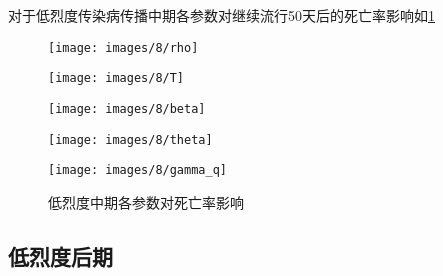 \documentclass[withoutpreface,bwprint]{cumcmthesis}
\begin{document}
对于低烈度传染病传播中期各参数对继续流行50天后的死亡率影响如\cref{fig:13}
\begin{figure}[H]
    \centering
    \begin{minipage}[c]{0.3\textwidth}
        \centering
        \texttt{[image: images/8/rho]}
        \subcaption{$\rho$}
    \end{minipage}
    \begin{minipage}[c]{0.3\textwidth}
        \centering
        \texttt{[image: images/8/T]}
    \end{minipage}
    \begin{minipage}[c]{0.3\textwidth}
        \centering
        \texttt{[image: images/8/beta]}
        \subcaption{$\beta$}
    \end{minipage}

    \begin{minipage}[c]{0.3\textwidth}
        \centering
        \texttt{[image: images/8/theta]}
        \subcaption{$\theta$}
    \end{minipage}
    \begin{minipage}[c]{0.3\textwidth}
        \centering
        \texttt{[image: images/8/gamma\_q]}
    \end{minipage}
    \caption{低烈度中期各参数对死亡率影响}
    \label{fig:13}

\end{figure}

\subsection{低烈度后期}
\end{document}
